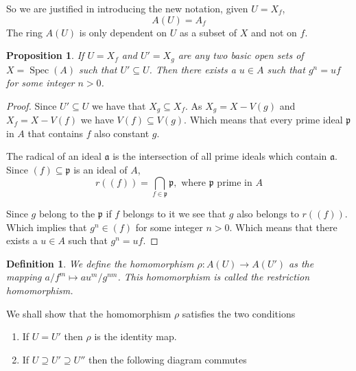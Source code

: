 \documentclass[]{report}
\newtheorem{prop}[theorem]{Proposition}
\newtheorem{defn}[theorem]{Definition}
\DeclareMathOperator\Spec{Spec}
\begin{document}
So we are justified in introducing the new notation, given $U = X_f$, 
    $$A(U) = A_f$$ 
    The ring $A(U)$ is only dependent on $U$ as a subset of $X$ and not on $f$.


\begin{prop}
    If $U = X_f$ and $U' = X_g$ are any two \textit{basic open sets} of $X = \Spec(A)$ such that $U' \subseteq U$. 
    Then there exists a $u \in A$ such that $g^n = uf$ for some integer $n > 0$. 
\end{prop}
\begin{proof}
    Since $U' \subseteq U$ we have that $X_g \subseteq X_f$. As $X_g = X - V(g)$ and $X_f = X - V(f)$ we have $V(f) \subseteq V(g)$. Which means that every prime ideal $\mathfrak{p}$ in $A$ that contains $f$ also constant $g$.

    The radical of an ideal $\mathfrak{a}$ is the intersection of all prime ideals which contain $\mathfrak{a}$. Since $(f) \subseteq \mathfrak{p}$ is an ideal of $A$, 
    $$r((f)) = \bigcap_{f \in \mathfrak{p}} \mathfrak{p}, \text{ where } \mathfrak{p} \text{ prime in } A$$

    Since $g$ belong to the $\mathfrak{p}$ if $f$ belongs to it we see that $g$ also belongs to $r((f))$. Which implies that $g^n \in (f)$ for some integer $n > 0$. Which means that there exists a $u \in A$ such that $g^n = uf$.
\end{proof}


\begin{defn}
    We define the homomorphism $\rho: A(U) \rightarrow A(U')$ as the mapping $a/f^m \mapsto au^m/g^{nm}$. This homomorphism is called the \textit{restriction} homomorphism.
\end{defn}

We shall show that the homomorphism $\rho$ satisfies the two conditions
    \begin{enumerate}
        \item If $U = U'$ then $\rho$ is the identity map.
        \item If $U \supseteq U' \supseteq U''$ then the following diagram commutes 
            \begin{center}
        \end{center}
    \end{enumerate} 
\end{document}
